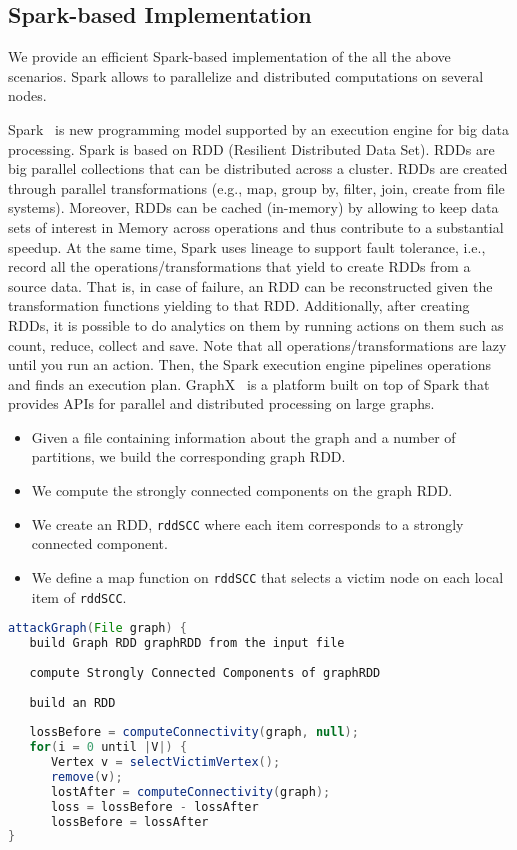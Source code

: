 \subsection{Spark-based Implementation}
We provide an efficient Spark-based implementation of the all the above scenarios. Spark allows to parallelize and distributed computations on several nodes. 

Spark~\cite{spark} is new programming model supported by an execution engine for big data processing. Spark is based on RDD (Resilient Distributed Data Set). RDDs are big parallel collections that can be distributed across a cluster. RDDs are created through parallel transformations (e.g., map, group by, filter, join, create from file systems). Moreover, RDDs can be cached (in-memory) by allowing to keep data sets of interest in Memory across operations and thus contribute to a substantial speedup. At the same time, Spark uses lineage to support fault tolerance, i.e., record all the operations/transformations that yield to create RDDs from a source data. That is, in case of failure, an RDD can be reconstructed given the transformation functions yielding to that RDD. Additionally, after creating RDDs, it is possible to do analytics on them by running actions on them such as count, reduce, collect and save. Note that all operations/transformations are lazy until you run an action. Then, the Spark execution engine pipelines operations and finds an execution plan. GraphX~\cite{graphx} is a platform built on top of Spark that provides APIs for parallel and distributed processing on large graphs. 

\begin{itemize}
\item Given a file containing information about the graph and a number of partitions, we build the corresponding graph RDD. 
\item We compute the strongly connected components on the graph RDD. 
\item We create an RDD, \texttt{rddSCC} where each item corresponds to a strongly connected component. 
\item We define a map function on \texttt{rddSCC} that selects a victim node on each local item of \texttt{rddSCC}.  
\end{itemize}

\begin{lstlisting}[language=java]
attackGraph(File graph) {
   build Graph RDD graphRDD from the input file
   
   compute Strongly Connected Components of graphRDD
   
   build an RDD 
   
   lossBefore = computeConnectivity(graph, null);
   for(i = 0 until |V|) {
      Vertex v = selectVictimVertex();
      remove(v);
      lostAfter = computeConnectivity(graph);
      loss = lossBefore - lossAfter
      lossBefore = lossAfter
}
\end{lstlisting}


